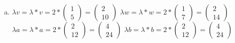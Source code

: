 \documentclass[10pt,ngerman]{scrartcl}
\begin{document}
\begin{enumerate}[1.]
\begin{enumerate}[(a)]
		    ~\newline~
		    \newpage
	\item
		    \begin{math}\lambda v = \lambda * v = 2 * \begin{pmatrix}1 \\ 5\end{pmatrix}= \begin{pmatrix}2 \\ 10\end{pmatrix}\end{math} \newline
		    \begin{math}\lambda w = \lambda * w = 2 * \begin{pmatrix}1 \\ 7\end{pmatrix}= \begin{pmatrix}2 \\ 14\end{pmatrix}\end{math} \newline
		    \begin{math}\lambda a = \lambda * a = 2 * \begin{pmatrix}2 \\ 12\end{pmatrix}= \begin{pmatrix}4 \\ 24\end{pmatrix}\end{math} \newline
		    \begin{math}\lambda b = \lambda * b = 2 * \begin{pmatrix}2 \\ 12\end{pmatrix}= \begin{pmatrix}4 \\ 24\end{pmatrix}\end{math} \newline
{}
\end{enumerate}
\end{enumerate}
\end{document}
